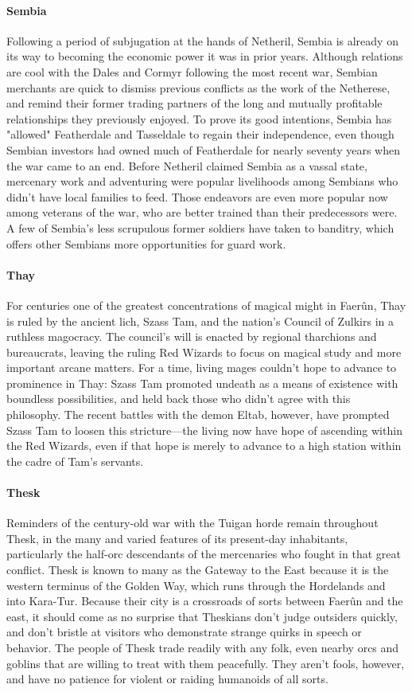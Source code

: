\documentclass[10pt,a4paper,twoside,twocolumn,openany,bg=print,nodeprecatedcode]{dndbook}
\begin{document}
\paragraph{Sembia}
Following a period of subjugation at the hands of Netheril, Sembia is already on its way to becoming the economic power it was in prior years. Although relations are cool with the Dales and Cormyr following the most recent war, Sembian merchants are quick to dismiss previous conflicts as the work of the Netherese, and remind their former trading partners of the long and mutually profitable relationships they previously enjoyed. To prove its good intentions, Sembia has "allowed" Featherdale and Tasseldale to regain their independence, even though Sembian investors had owned much of Featherdale for nearly seventy years when the war came to an end.
Before Netheril claimed Sembia as a vassal state, mercenary work and adventuring were popular livelihoods among Sembians who didn't have local families to feed. Those endeavors are even more popular now among veterans of the war, who are better trained than their predecessors were. A few of Sembia's less scrupulous former soldiers have taken to banditry, which offers other Sembians more opportunities for guard work.
\paragraph{Thay}
For centuries one of the greatest concentrations of magical might in Faerûn, Thay is ruled by the ancient lich, Szass Tam, and the nation's Council of Zulkirs in a ruthless magocracy. The council's will is enacted by regional tharchions and bureaucrats, leaving the ruling Red Wizards to focus on magical study and more important arcane matters.
For a time, living mages couldn't hope to advance to prominence in Thay: Szass Tam promoted undeath as a means of existence with boundless possibilities, and held back those who didn't agree with this philosophy. The recent battles with the demon Eltab, however, have prompted Szass Tam to loosen this stricture—the living now have hope of ascending within the Red Wizards, even if that hope is merely to advance to a high station within the cadre of Tam's servants.
\paragraph{Thesk}
Reminders of the century-old war with the Tuigan horde remain throughout Thesk, in the many and varied features of its present-day inhabitants, particularly the half-orc descendants of the mercenaries who fought in that great conflict.
Thesk is known to many as the Gateway to the East because it is the western terminus of the Golden Way, which runs through the Hordelands and into Kara-Tur. Because their city is a crossroads of sorts between Faerûn and the east, it should come as no surprise that Theskians don't judge outsiders quickly, and don't bristle at visitors who demonstrate strange quirks in speech or behavior. The people of Thesk trade readily with any folk, even nearby orcs and goblins that are willing to treat with them peacefully. They aren't fools, however, and have no patience for violent or raiding humanoids of all sorts.
\end{document}
